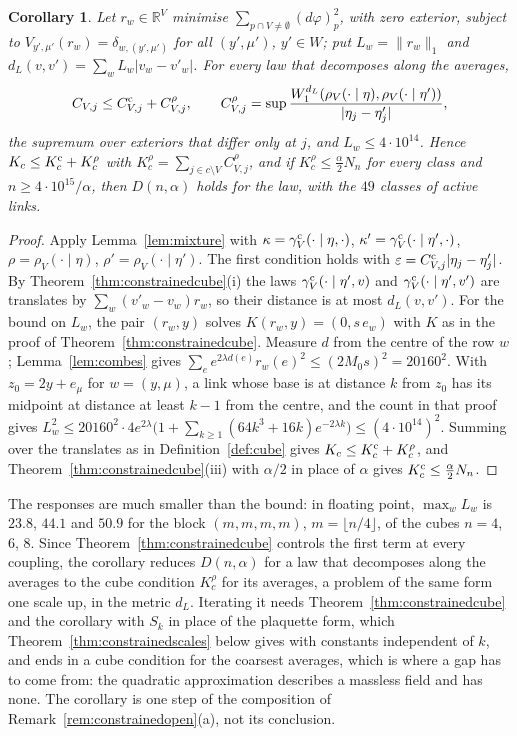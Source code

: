 \documentclass[11pt]{amsart}
\newtheorem{corollary}[theorem]{Corollary}
\theoremstyle{definition}
\theoremstyle{remark}
\numberwithin{equation}{section}
\newcommand{\R}{\mathbb{R}}
\begin{document}
\begin{corollary}\label{cor:compose}
Let $r_w\in\R^V$ minimise $\sum_{p\cap V\ne\emptyset}(d\varphi)_p^2$, with
zero exterior, subject to $V_{y',\mu'}(r_w)=\delta_{w,(y',\mu')}$ for all
$(y',\mu')$, $y'\in W$; put $L_w=\|r_w\|_1$ and $d_L(v,v')=\sum_wL_w
|v_w-v'_w|$. For every law that decomposes along the averages,
\[
C_{V,j}\le C^{\rm c}_{V,j}+C^\rho_{V,j},\qquad C^\rho_{V,j}=\sup\frac{W_1^{
d_L}(\rho_V(\cdot\mid\eta),\rho_V(\cdot\mid\eta'))}{|\eta_j-\eta'_j|},
\]
the supremum over exteriors that differ only at $j$, and $L_w\le4\cdot
10^{14}$. Hence $K_c\le K^{\rm c}_c+K^\rho_c$ with $K^\rho_c=\sum_{j\in
c\setminus V}C^\rho_{V,j}$, and if $K^\rho_c\le\frac\alpha2N_n$ for every
class and $n\ge4\cdot10^{15}/\alpha$, then $D(n,\alpha)$ holds for the law, with the $49$ classes of active links.
\end{corollary}

\begin{proof}
Apply Lemma~\ref{lem:mixture} with $\kappa=\gamma^{\rm c}_V(\cdot\mid\eta,
\cdot)$, $\kappa'=\gamma^{\rm c}_V(\cdot\mid\eta',\cdot)$, $\rho=\rho_V(\cdot
\mid\eta)$, $\rho'=\rho_V(\cdot\mid\eta')$. The first condition holds with
$\varepsilon=C^{\rm c}_{V,j}|\eta_j-\eta'_j|$. By
Theorem~\ref{thm:constrainedcube}(i) the laws $\gamma^{\rm c}_V(\cdot\mid
\eta',v)$ and $\gamma^{\rm c}_V(\cdot\mid\eta',v')$ are translates by
$\sum_w(v'_w-v_w)r_w$, so their distance is at most $d_L(v,v')$. For the
bound on $L_w$, the pair $(r_w,y)$ solves $K(r_w,y)=(0,s\,e_w)$ with $K$ as
in the proof of Theorem~\ref{thm:constrainedcube}. Measure $d$ from the
centre of the row $w$; Lemma~\ref{lem:combes} gives $\sum_ee^{2\lambda d(e)}
r_w(e)^2\le(2M_0s)^2=20160^2$. With $z_0=2y+e_\mu$ for $w=(y,\mu)$, a link
whose base is at distance $k$ from $z_0$ has its midpoint at distance at
least $k-1$ from the centre, and the count in that proof gives $L_w^2\le
20160^2\cdot4e^{2\lambda}\bigl(1+\sum_{k\ge1}(64k^3+16k)e^{-2\lambda k}\bigr)
\le(4\cdot10^{14})^2$. Summing over the translates as in
Definition~\ref{def:cube} gives $K_c\le K^{\rm c}_c+K^\rho_c$, and
Theorem~\ref{thm:constrainedcube}(iii) with $\alpha/2$ in place of $\alpha$
gives $K^{\rm c}_c\le\frac\alpha2N_n$.
\end{proof}

The responses are much smaller than the bound: in floating point,
$\max_wL_w$ is $23.8$, $44.1$ and $50.9$ for the block $(m,m,m,m)$,
$m=\lfloor n/4\rfloor$, of the cubes $n=4$, $6$, $8$. Since
Theorem~\ref{thm:constrainedcube} controls the first term at every coupling,
the corollary reduces $D(n,\alpha)$ for a law that decomposes along the
averages to the cube condition $K^\rho_c$ for its averages, a problem of the
same form one scale up, in the metric $d_L$. Iterating it needs
Theorem~\ref{thm:constrainedcube} and the corollary with $S_k$ in place of
the plaquette form, which Theorem~\ref{thm:constrainedscales} below gives
with constants independent of $k$, and ends in
a cube condition for the coarsest averages, which is where a gap has to come
from: the quadratic approximation describes a massless field and has none.
The corollary is one step of the composition of
Remark~\ref{rem:constrainedopen}(a), not its conclusion.
\end{document}
